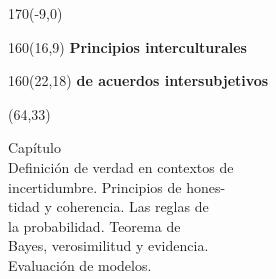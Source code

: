 \documentclass[shownotes,aspectratio=169]{beamer}
\newcounter{capitulo}
\newcommand{\unidad}{\thecapitulo \stepcounter{capitulo}}
\begin{document}
\begin{frame}
\begin{textblock}{170}(-9,0)
\end{textblock}

\begin{textblock}{160}(16,9)
\LARGE \textcolor{black!5}{\fontsize{22}{0}\selectfont \textbf{Principios interculturales}}
\end{textblock}
\begin{textblock}{160}(22,18)
\LARGE \textcolor{black!5}{\fontsize{22}{0}\selectfont \textbf{de acuerdos intersubjetivos}}
\end{textblock}


\begin{textblock}{55}(64,33)
\begin{turn}{33}
\parbox{6cm}{
\textcolor{black!5}{\hspace{-0.3cm}Capítulo \unidad} \\
\small\textcolor{black!5}{\hspace{-0.1cm}Definición de verdad en contextos de}\\
\small\textcolor{black!5}{\hspace{0.07cm}incertidumbre. Principios de hones-} \\
\small\textcolor{black!5}{\hspace{0.25cm}tidad y coherencia. Las reglas de} \\ \small\textcolor{black!5}{\hspace{0.4cm}la probabilidad. Teorema de} \\
\small\textcolor{black!5}{\hspace{0.36cm}Bayes, verosimilitud y evidencia.} \\
\small\textcolor{black!5}{\hspace{0.46cm}Evaluación de modelos.} \\
}
\end{turn}
\end{textblock}


\end{frame}
\end{document}

